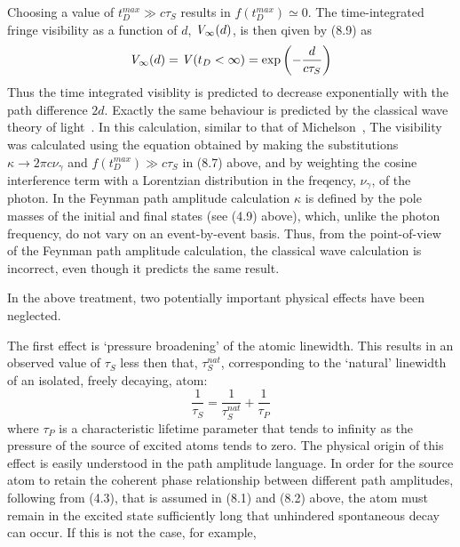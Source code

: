 {    \par Choosing a value of $t_D^{max} \gg c \tau_S$ results in $f(t_D^{max})\simeq 0$. The time-integrated
    fringe visibility as a function of $d$, ${\it V}_{\infty}(d)$, is then qiven 
    by (8.9) as 
    \begin{equation}
    {\it V}_{\infty}(d) = {\it V}(t_D < \infty ) = \exp\left(-\frac{d}{c \tau_S}\right)
    \end{equation} 
     Thus the time integrated visiblity is predicted to decrease exponentially with the path
    difference $2d$. Exactly the same behaviour is predicted by the classical wave theory of
    light~\cite{MW3}. In this calculation, similar to that of Michelson~\cite{Michelson1},
    The visibility was calculated using the equation obtained by making the 
    substitutions $\kappa \rightarrow 2 \pi c \nu_{\gamma}$ and  $f(t_D^{max}) \gg c\tau_S$
   in (8.7) above, and by weighting the cosine interference term with
   a Lorentzian distribution in the freqency, $\nu_{\gamma}$, of the photon. 
     In the Feynman path amplitude calculation $\kappa$ is defined by the pole masses
    of the initial and final states (see (4.9) above), which, unlike the photon
    frequency, do not vary on an event-by-event basis. Thus, from the point-of-view of
    the Feynman path amplitude calculation, the classical wave calculation is incorrect,
    even though it predicts the same result.
    \par In the above treatment, two potentially important physical effects have been neglected.
    \par The first effect is `pressure broadening' of the atomic linewidth. This results in an observed
    value of $\tau_S$ less then that, $\tau_S^{nat}$, corresponding to the `natural' linewidth of
    an isolated, freely decaying, atom:
      \begin{equation}
       \frac{1}{\tau_S}=  \frac{1}{\tau_S^{nat}}+ \frac{1}{\tau_P}
     \end{equation}
      where $\tau_P$ is a characteristic lifetime parameter that tends to infinity as the 
      pressure of the source of excited atoms tends to zero. The physical origin of this effect
    is easily understood in the path amplitude language. In order for the source atom to retain
     the coherent phase relationship between different path amplitudes, following from
      (4.3), that is assumed in (8.1) and (8.2) above, the atom must remain in the excited state sufficiently
      long that unhindered spontaneous decay can occur. If this is not the case, for example,
}
